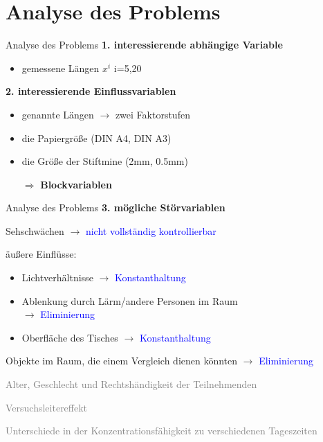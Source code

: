 \documentclass[ ngerman, fontsize= 10pt, headings=big, titlepage=true, xcolor=dvipsnames]{beamer}
\begin{document}
\section{Analyse des Problems}
\begin{frame}{Analyse des Problems}
	\textbf{1. interessierende abhängige Variable}
	\begin{itemize}
	\item gemessene Längen $x^{i}$ i=5,20
	\end{itemize}
	\textbf{2. interessierende Einflussvariablen}
	\begin{itemize}
	\item genannte Längen $\rightarrow$ zwei Faktorstufen
	\item die Papiergröße (DIN A4, DIN A3)
	\item die Größe der Stiftmine (2mm, 0.5mm)
	\item[$\Rightarrow$] \textbf{Blockvariablen}
	\end{itemize}
\end{frame}
\begin{frame}{Analyse des Problems}
    \textbf{3. mögliche Störvariablen}
    \begin{itemize}
    \item Sehschwächen $\rightarrow$ \textcolor{blue}{nicht vollständig kontrollierbar}
    \item äußere Einflüsse: 
    \begin{itemize}
    \item Lichtverhältnisse $\rightarrow$ \textcolor{blue}{Konstanthaltung}
    \item Ablenkung durch Lärm/andere Personen im Raum \\ $\rightarrow$ \textcolor{blue}{Eliminierung}
    \item Oberfläche des Tisches $\rightarrow$ \textcolor{blue}{Konstanthaltung}
    \end{itemize}
    \item Objekte im Raum, die einem Vergleich dienen könnten $\rightarrow$ \textcolor{blue}{Eliminierung}
   \textcolor{gray}{
    \item Alter, Geschlecht und Rechtshändigkeit der Teilnehmenden
    \item Versuchsleitereffekt
    \item Unterschiede in der Konzentrationsfähigkeit zu verschiedenen Tageszeiten
    }
    \end{itemize}
    
\end{frame}
\end{document}
